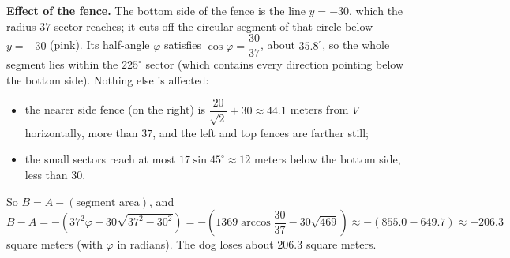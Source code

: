 \textbf{Effect of the fence.} The bottom side of the fence is the line $y=-30$, which the radius-$37$ sector reaches; it cuts off the circular segment of that circle below $y=-30$ (pink). Its half-angle $\varphi$ satisfies $\cos\varphi=\dfrac{30}{37}$, about $35.8^\circ$, so the whole segment lies within the $225^\circ$ sector (which contains every direction pointing below the bottom side). Nothing else is affected:
\begin{itemize}
\item the nearer side fence (on the right) is $\dfrac{20}{\sqrt2}+30\approx44.1$ meters from $V$ horizontally, more than $37$, and the left and top fences are farther still;
\item the small sectors reach at most $17\sin45^\circ\approx12$ meters below the bottom side, less than $30$.
\end{itemize}
So $B=A-(\text{segment area})$, and
\[
B-A=-\left(37^2\varphi-30\sqrt{37^2-30^2}\right)=-\left(1369\arccos\dfrac{30}{37}-30\sqrt{469}\right)\approx-(855.0-649.7)\approx\boxed{-206.3}
\]
square meters (with $\varphi$ in radians). The dog loses about $206.3$ square meters.
